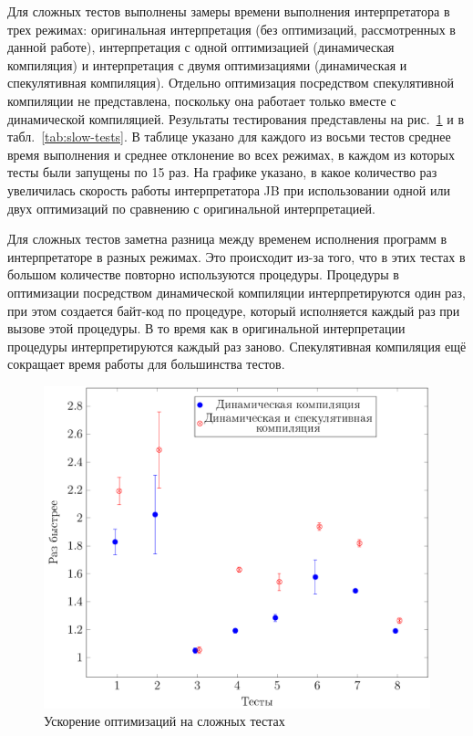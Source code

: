 	Для сложных тестов выполнены замеры времени выполнения интерпретатора в трех режимах: оригинальная интерпретация (без оптимизаций, рассмотренных в данной работе), интерпретация с одной оптимизацией (динамическая компиляция) и интерпретация с двумя оптимизациями (динамическая и спекулятивная компиляция). Отдельно оптимизация посредством спекулятивной компиляции не представлена, поскольку она работает только вместе с динамической компиляцией. Результаты тестирования представлены на  рис.~\ref{graphic: slow} и в табл.~\ref{tab:slow-tests}.
	В таблице указано для каждого из восьми тестов среднее время выполнения и среднее отклонение во всех режимах, в каждом из которых тесты были запущены по 15 раз. На графике указано, в какое количество раз увеличилась скорость работы интерпретатора JB при использовании одной или двух оптимизаций по сравнению с оригинальной интерпретацией. 
	
	Для сложных тестов заметна разница между временем исполнения программ в интерпретаторе в разных режимах. Это происходит из-за того, что в этих тестах в большом количестве повторно используются процедуры. Процедуры в оптимизации посредством динамической компиляции интерпретируются один раз, при этом создается байт-код по процедуре, который исполняется каждый раз при вызове этой процедуры. В то время как в оригинальной интерпретации процедуры интерпретируются каждый раз заново. Спекулятивная компиляция ещё сокращает время работы для большинства тестов.
		\begin{figure} [h]
			\includegraphics[width=0.87\linewidth]{Pozdin/TimesGraphic.png}
			\caption{Ускорение оптимизаций на сложных тестах}\label{graphic: slow}
		\end{figure}	
		
